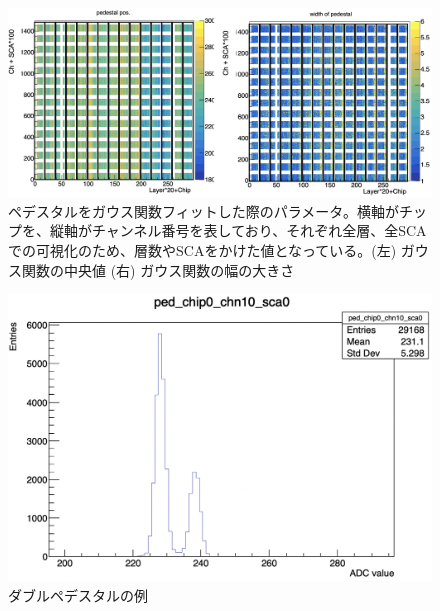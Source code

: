 \begin{figure}[H]
\begin{center}
 \includegraphics[keepaspectratio, scale=0.3]
 	{Figure/Beamtest/ped_pos.png}
 		\caption[全チャンネルに対するペデスタルのフィッティング]{ペデスタルをガウス関数フィットした際のパラメータ。横軸がチップを、縦軸がチャンネル番号を表しており、それぞれ全層、全SCAでの可視化のため、層数やSCAをかけた値となっている。(左) ガウス関数の中央値 (右) ガウス関数の幅の大きさ}
		\label{means}
\end{center}
\end{figure}
\begin{figure}[H]
\begin{center}
 \includegraphics[keepaspectratio, scale=0.3]
 	{Figure/Beamtest/dp.png}
 		\caption{ダブルペデスタルの例}
		\label{dp}
\end{center}
\end{figure}
